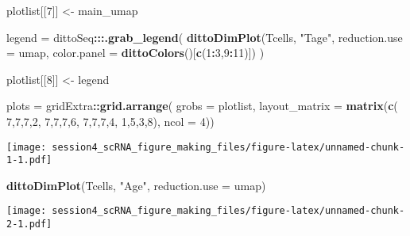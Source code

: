 \documentclass[
]{article}
\newenvironment{Shaded}{\begin{snugshade}}{\end{snugshade}}
\newcommand{\AttributeTok}[1]{\textcolor[rgb]{0.13,0.29,0.53}{#1}}
\newcommand{\DecValTok}[1]{\textcolor[rgb]{0.00,0.00,0.81}{#1}}
\newcommand{\FunctionTok}[1]{\textcolor[rgb]{0.13,0.29,0.53}{\textbf{#1}}}
\newcommand{\NormalTok}[1]{#1}
\newcommand{\OtherTok}[1]{\textcolor[rgb]{0.56,0.35,0.01}{#1}}
\newcommand{\SpecialCharTok}[1]{\textcolor[rgb]{0.81,0.36,0.00}{\textbf{#1}}}
\newcommand{\StringTok}[1]{\textcolor[rgb]{0.31,0.60,0.02}{#1}}
\begin{document}
\begin{Shaded}
\begin{Highlighting}[]
\NormalTok{plotlist[[}\DecValTok{7}\NormalTok{]] }\OtherTok{\textless{}{-}}\NormalTok{ main\_umap}

\NormalTok{legend }\OtherTok{=}\NormalTok{ dittoSeq}\SpecialCharTok{:::}\FunctionTok{.grab\_legend}\NormalTok{(}
  \FunctionTok{dittoDimPlot}\NormalTok{(Tcells, }\StringTok{"Tage"}\NormalTok{, }\AttributeTok{reduction.use =} \StringTok{\textquotesingle{}umap\textquotesingle{}}\NormalTok{,}
               \AttributeTok{color.panel =} \FunctionTok{dittoColors}\NormalTok{()[}\FunctionTok{c}\NormalTok{(}\DecValTok{1}\SpecialCharTok{:}\DecValTok{3}\NormalTok{,}\DecValTok{9}\SpecialCharTok{:}\DecValTok{11}\NormalTok{)])}
\NormalTok{  )}

\NormalTok{plotlist[[}\DecValTok{8}\NormalTok{]] }\OtherTok{\textless{}{-}}\NormalTok{ legend}
\end{Highlighting}
\end{Shaded}

\begin{Shaded}
\begin{Highlighting}[]
\NormalTok{plots }\OtherTok{=}\NormalTok{ gridExtra}\SpecialCharTok{::}\FunctionTok{grid.arrange}\NormalTok{(}
  \AttributeTok{grobs =}\NormalTok{ plotlist,}
  \AttributeTok{layout\_matrix =} \FunctionTok{matrix}\NormalTok{(}\FunctionTok{c}\NormalTok{(}
    \DecValTok{7}\NormalTok{,}\DecValTok{7}\NormalTok{,}\DecValTok{7}\NormalTok{,}\DecValTok{2}\NormalTok{,}
    \DecValTok{7}\NormalTok{,}\DecValTok{7}\NormalTok{,}\DecValTok{7}\NormalTok{,}\DecValTok{6}\NormalTok{,}
    \DecValTok{7}\NormalTok{,}\DecValTok{7}\NormalTok{,}\DecValTok{7}\NormalTok{,}\DecValTok{4}\NormalTok{,}
    \DecValTok{1}\NormalTok{,}\DecValTok{5}\NormalTok{,}\DecValTok{3}\NormalTok{,}\DecValTok{8}\NormalTok{),}
    \AttributeTok{ncol =} \DecValTok{4}\NormalTok{))}
\end{Highlighting}
\end{Shaded}

\texttt{[image: session4\_scRNA\_figure\_making\_files/figure-latex/unnamed-chunk-1-1.pdf]}

\begin{Shaded}
\begin{Highlighting}[]
\FunctionTok{dittoDimPlot}\NormalTok{(Tcells, }\StringTok{"Age"}\NormalTok{, }\AttributeTok{reduction.use =} \StringTok{\textquotesingle{}umap\textquotesingle{}}\NormalTok{)}
\end{Highlighting}
\end{Shaded}

\texttt{[image: session4\_scRNA\_figure\_making\_files/figure-latex/unnamed-chunk-2-1.pdf]}
\end{document}
